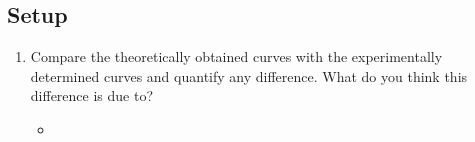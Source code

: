 \documentclass{article}
\begin{document}
\begin{center}
  \subsection*{Setup}
\end{center}


\newpage
\begin{center}
  \begin{enumerate}
    \item Compare the theoretically obtained curves with the experimentally determined curves and quantify any difference. What do you think this difference is due to?
    \begin{itemize}
      \item
    \end{itemize}
  \end{enumerate}
\end{center}
\end{document}
